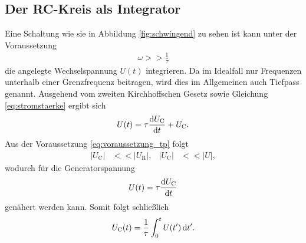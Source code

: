 \subsection{Der RC-Kreis als Integrator}
Eine Schaltung wie sie in Abbildung \ref{fig:schwingend} zu sehen ist kann unter der Voraussetzung
\begin{align}
    \omega >> \frac{1}{\tau}
    \label{eq:voraussetzung_tp} 
\end{align}
die angelegte Wechselspannung $U(t)$ integrieren.
Da im Idealfall nur Frequenzen unterhalb einer Grenzfrequenz beitragen, wird dies im Allgemeinen auch Tiefpass genannt.
Ausgehend vom zweiten Kirchhoffschen Gesetz sowie Gleichung \eqref{eq:stromstaerke} ergibt sich
\begin{align}
    U(t) = \tau \frac{\mathop{}\!\mathrm{d}{U_\text{C}}}{\mathop{}\!\mathrm{d}{t}} + U_\text{C}.
\end{align}
Aus der Voraussetzung \eqref{eq:voraussetzung_tp} folgt
\begin{align}
    |U_\text{C}| &<< |U_\text{R}|, & |U_\text{C}| &<< |U|,
\end{align}
wodurch für die Generatorspannung 
\begin{align*}
    U(t) = \tau \frac{\mathop{}\!\mathrm{d}{U_\text{C}}}{\mathop{}\!\mathrm{d}{t}}
\end{align*}
genähert werden kann.
Somit folgt schließlich
\begin{align}
    U_\text{C}(t) = \frac{1}{\tau} \int_0^t U(t') \mathop{}\!\mathrm{d}{t'}.
\end{align}